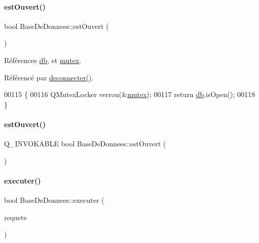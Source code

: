 \paragraph{\texorpdfstring{est\+Ouvert()}{estOuvert()}\hspace{0.1cm}{\footnotesize\ttfamily [1/2]}}
{\footnotesize\ttfamily bool Base\+De\+Donnees\+::est\+Ouvert (\begin{DoxyParamCaption}{ }\end{DoxyParamCaption})}



Références \hyperlink{class_base_de_donnees_a3e738dcf443370c46a541677ab619f06}{db}, et \hyperlink{class_base_de_donnees_aa1b4696fac87a740f914aa73739086f2}{mutex}.



Référencé par \hyperlink{class_base_de_donnees_ae780999d25a26a0e4dbe0706a4785978}{deconnecter()}.


\begin{DoxyCode}
00115 \{
00116     QMutexLocker verrou(&\hyperlink{class_base_de_donnees_aa1b4696fac87a740f914aa73739086f2}{mutex});
00117     \textcolor{keywordflow}{return} \hyperlink{class_base_de_donnees_a3e738dcf443370c46a541677ab619f06}{db}.isOpen();
00118 \}
\end{DoxyCode}
\mbox{\label{class_base_de_donnees_a4775c12990ad9aa04436cca39d38ea87}} 
\paragraph{\texorpdfstring{est\+Ouvert()}{estOuvert()}\hspace{0.1cm}{\footnotesize\ttfamily [2/2]}}
{\footnotesize\ttfamily Q\+\_\+\+I\+N\+V\+O\+K\+A\+B\+LE bool Base\+De\+Donnees\+::est\+Ouvert (\begin{DoxyParamCaption}{ }\end{DoxyParamCaption})}

\mbox{\label{class_base_de_donnees_aa8de5f8f8bb17edc43f5c0ee33712081}} 
\paragraph{\texorpdfstring{executer()}{executer()}\hspace{0.1cm}{\footnotesize\ttfamily [1/2]}}
{\footnotesize\ttfamily bool Base\+De\+Donnees\+::executer (\begin{DoxyParamCaption}\item[{Q\+String}]{requete }\end{DoxyParamCaption})}



